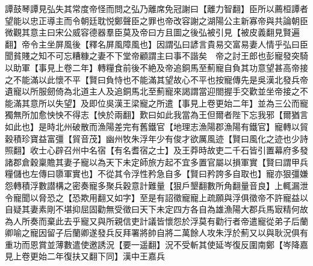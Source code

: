 譚鼓琴譚見弘失其常度帝怪而問之弘乃離席免冠謝曰【離力智翻】臣所以薦桓譚者望能以忠正導主而令朝廷耽悦鄭聲臣之罪也帝改容謝之湖陽公主新寡帝與共論朝臣微觀其意主曰宋公威容德器羣臣莫及帝曰方且圖之後弘被引見【被皮義翻見賢遍翻】帝令主坐屏風後【釋名屏風障風也】因謂弘曰諺言貴易交富易妻人情乎弘曰臣聞貧賤之知不可忘糟糠之妻不下堂帝顧謂主曰事不諧矣　帝之討王郎也彭寵發突騎以助軍【事見上卷二年】轉糧食前後不絶及帝追銅馬至薊寵自負其功意望甚高帝接之不能滿以此懷不平【賢曰負恃也不能滿其望故心不平也按寵傳先是吳漢北發兵帝遺寵以所服劒倚為北道主人及追銅馬北至薊寵來謁謂當迎閤握手交歡並坐帝接之不能滿其意所以失望】及即位吳漢王梁寵之所遣【事見上卷更始二年】並為三公而寵獨無所加愈怏怏不得志【怏於兩翻】歎曰如此我當為王但爾者陛下忘我邪【爾猶言如此也】是時北州破散而漁陽差完有舊鐵官【地理志漁陽郡漁陽有鐵官】寵轉以貿穀積珍寶益富彊【貿音茂】幽州牧朱浮年少有俊才欲厲風迹【賢曰風化之迹也少詩照翻】收士心辟召州中名宿【有名耆宿之士】及王莽時故吏二千石皆引置幕府多發諸郡倉穀稟贍其妻子寵以為天下未定師旅方起不宜多置官屬以損軍實【賢曰謂甲兵糧儲也左傳曰隳軍實也】不從其令浮性矜急自多【賢曰矜誇多自取也】寵亦狠彊嫌怨轉積浮數譛構之密奏寵多聚兵穀意計難量【狠戶墾翻數所角翻量音良】上輒漏泄令寵聞以脅恐之【恐欺用翻又如字】至是有詔徵寵寵上疏願與浮俱徵帝不許寵益以自疑其妻素剛不堪抑屈固勸無受徵曰天下未定四方各自為雄漁陽大郡兵馬㝡精何故為人所奏而棄此去乎寵又與所親信吏計議皆懷怨於浮莫有勸行者帝遣寵從弟子后蘭卿喻之寵因留子后蘭卿遂發兵反拜署將帥自將二萬餘人攻朱浮於薊又以與耿況俱有重功而恩賞並薄數遣使邀誘況【要一遥翻】況不受斬其使延岑復反圍南鄭【岑降嘉見上卷更始二年復扶又翻下同】漢中王嘉兵

